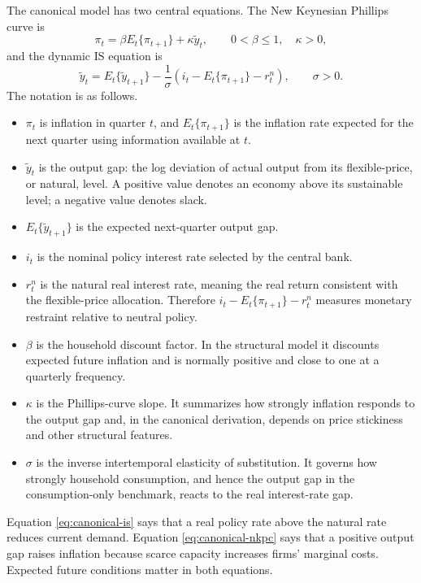 \documentclass[11pt]{article}
\newcommand{\gap}{\widetilde y}
\newcommand{\rstar}{r^{n}}
\begin{document}
The canonical model has two central equations.  The New Keynesian Phillips
curve is
\begin{equation}
  \pi_t=\beta E_t\{\pi_{t+1}\}+\kappa\gap_t,
  \qquad 0<\beta\leq1,\quad \kappa>0,
  \label{eq:canonical-nkpc}
\end{equation}
and the dynamic IS equation is
\begin{equation}
  \gap_t=E_t\{\gap_{t+1}\}
  -\frac{1}{\sigma}\left(i_t-E_t\{\pi_{t+1}\}-\rstar_t\right),
  \qquad \sigma>0.
  \label{eq:canonical-is}
\end{equation}
The notation is as follows.
\begin{itemize}
  \item $\pi_t$ is inflation in quarter $t$, and $E_t\{\pi_{t+1}\}$ is the
  inflation rate expected for the next quarter using information available at
  $t$.
  \item $\gap_t$ is the output gap: the log deviation of actual output from its
  flexible-price, or natural, level.  A positive value denotes an economy above
  its sustainable level; a negative value denotes slack.
  \item $E_t\{\gap_{t+1}\}$ is the expected next-quarter output gap.
  \item $i_t$ is the nominal policy interest rate selected by the central bank.
  \item $\rstar_t$ is the natural real interest rate, meaning the real return
  consistent with the flexible-price allocation.  Therefore
  $i_t-E_t\{\pi_{t+1}\}-\rstar_t$ measures monetary restraint relative to
  neutral policy.
  \item $\beta$ is the household discount factor.  In the structural model it
  discounts expected future inflation and is normally positive and close to
  one at a quarterly frequency.
  \item $\kappa$ is the Phillips-curve slope.  It summarizes how strongly
  inflation responds to the output gap and, in the canonical derivation,
  depends on price stickiness and other structural features.
  \item $\sigma$ is the inverse intertemporal elasticity of substitution.  It
  governs how strongly household consumption, and hence the output gap in the
  consumption-only benchmark, reacts to the real interest-rate gap.
\end{itemize}

Equation \eqref{eq:canonical-is} says that a real policy rate above the natural
rate reduces current demand.  Equation \eqref{eq:canonical-nkpc} says that a
positive output gap raises inflation because scarce capacity increases firms'
marginal costs.  Expected future conditions matter in both equations.
\end{document}
